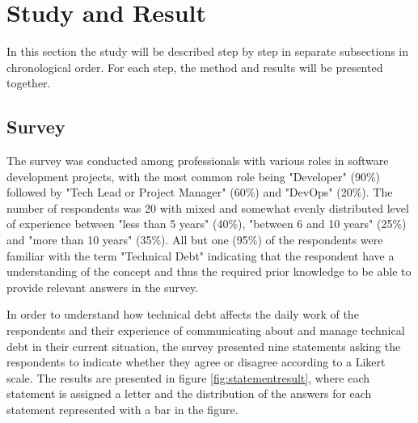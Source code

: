 

\section{Study and Result}

In this section the study will be described step by step in separate subsections in chronological order.
For each step, the method and results will be presented together.


\subsection{Survey}

The survey was conducted among professionals with various roles in software development projects, with the most common role being "Developer" (90\%) followed by "Tech Lead or Project Manager" (60\%) and "DevOps" (20\%).
The number of respondents was 20 with mixed and somewhat evenly distributed level of experience between "less than 5 years" (40\%), "between 6 and 10 years" (25\%) and "more than 10 years" (35\%).
All but one (95\%) of the respondents were familiar with the term "Technical Debt" indicating that the respondent have a understanding of the concept and thus the required prior knowledge to be able to provide relevant answers in the survey.

In order to understand how technical debt affects the daily work of the respondents and their experience of communicating about and manage technical debt in their current situation, the survey presented nine statements asking the respondents to indicate whether they agree or disagree according to a Likert scale. %
The results are presented in figure \ref{fig:statementresult}, where each statement is assigned a letter and the distribution of the answers for each statement represented with a bar in the figure.

